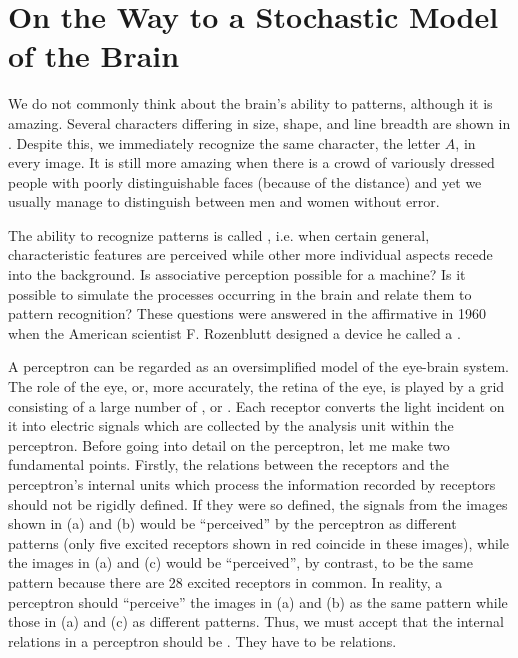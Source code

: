 \section{On the Way to a Stochastic Model of the Brain}

 We do not commonly think about the
brain's ability to  patterns, although it is amazing. Several
characters differing in size, shape, and line breadth are shown in
. Despite this, we immediately recognize the same character, the letter $A$, in every image. It is still more amazing when there is a crowd
of variously dressed people with poorly distinguishable faces (because of
the distance) and yet we usually manage to distinguish between men and
women without error.

The ability to recognize patterns is called , i.e.
when certain general, characteristic features are perceived while other
more individual aspects recede into the background. Is associative
perception possible for a machine? Is it possible to simulate the
processes occurring in the brain and relate them to pattern recognition?
These questions were answered in the affirmative in 1960 when the
American scientist F. Rozenblutt designed a device he called
a .

 A perceptron can be regarded as an
oversimplified model of the eye-brain system. The role of the eye, or,
more accurately, the retina of the eye, is played by a grid consisting of
a large number of , or . Each receptor converts the light incident on it into electric signals which are collected by the analysis unit within the perceptron. Before going into detail on
the perceptron, let me make two fundamental points. Firstly, the
relations between the receptors and the perceptron's internal units which
process the information recorded by receptors should not be rigidly
defined. If they were so defined, the signals from the images shown in
 (a) and (b) would be ``perceived'' by the perceptron as
different patterns (only five excited receptors shown in red coincide in
these images), while the images in  (a) and (c) would be
``perceived'', by contrast, to be the same pattern because there are 28
excited receptors in common. In reality, a perceptron should ``perceive''
the images in  (a) and (b) as the same pattern while those in  (a) and (c) as different patterns. Thus, we must accept that the internal relations in a perceptron should be . They have to be  relations.

